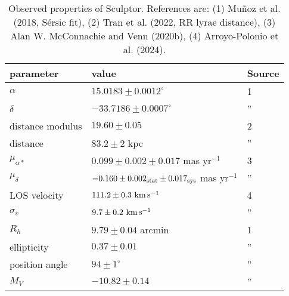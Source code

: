 \begin{table*}[t]
\centering
\caption[Observed Properties of Sculptor]{Observed properties of Sculptor. References are: (1) Muñoz et al. (2018, Sérsic fit), (2) Tran et al. (2022, RR lyrae distance), (3) Alan W. McConnachie and Venn (2020b), (4) Arroyo-Polonio et al. (2024). }
\label{tbl:scl_obs_props}
\begin{tabular}{lll}
\toprule
parameter & value & Source\\
\midrule
$\alpha$ & $15.0183 \pm 0.0012^\circ$ & 1\\
$\delta$ & $-33.7186 \pm 0.0007^\circ$ & ”\\
distance modulus & $19.60 \pm 0.05$ & 2\\
distance & $83.2 \pm 2$ kpc & ”\\
$\mu_{\alpha*}$ & $0.099 \pm 0.002 \pm 0.017$ mas yr$^{-1}$ & 3\\
$\mu_\delta$ & $-0.160 \pm 0.002_{\rm stat} \pm 0.017_{\rm sys}$ mas yr$^{-1}$ & ”\\
LOS velocity & $111.2 \pm 0.3\ {\rm km\,s^{-1}}$ & 4\\
$\sigma_v$ & $9.7\pm0.2\ {\rm km\,s^{-1}}$ & ”\\
$R_h$ & $9.79 \pm 0.04$ arcmin & 1\\
ellipticity & $0.37 \pm 0.01$ & ”\\
position angle & $94\pm1^\circ$ & ”\\
$M_V$ & $-10.82\pm0.14$ & ”\\
\bottomrule
\end{tabular}
\end{table*}

